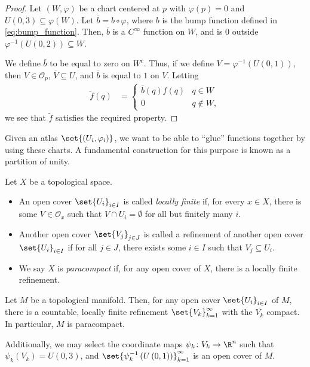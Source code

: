 \documentclass[10pt]{mypackage}
\begin{document}
\begin{proof}
  Let $\left( W,\varphi \right)$ be a chart centered at $p$ with $\varphi(p) = 0$ and $U\left( 0,3 \right)\subseteq \varphi(W)$. Let $ \overline{b} = b\circ\varphi $, where $b$ is the bump function defined in \eqref{eq:bump_function}. Then, $ \overline{b} $ is a $C^{\infty}$ function on $W$, and is $0$ outside $ \varphi^{-1}\left( U\left( 0,2 \right) \right) \subseteq W $.\newline

  We define $ \overline{b} $ to be equal to zero on $W^{c}$. Thus, if we define $V = \varphi^{-1}\left( U\left( 0,1 \right) \right)$, then $V\in \mathcal{O}_p$, $ \overline{V}\subseteq U $, and $ \overline{b} $ is equal to $1$ on $V$. Letting
  \begin{align*}
    \widetilde{f}(q) &= \begin{cases}
      \overline{b}(q) f(q) & q\in W\\
      0 & q\notin W,
    \end{cases}
  \end{align*}
  we see that $ \widetilde{f} $ satisfies the required property.
\end{proof}
Given an atlas $\set{\left( U_i,\varphi_i \right)}$, we want to be able to ``glue'' functions together by using these charts. A fundamental construction for this purpose is known as a partition of unity.
\begin{definition}
  Let $X$ be a topological space.
  \begin{itemize}
    \item An open cover $\set{U_{i}}_{i\in I}$ is called \textit{locally finite} if, for every $x\in X$, there is some $V\in \mathcal{O}_x$ such that $V\cap U_{i} = \emptyset$ for all but finitely many $i$.
    \item Another open cover $\set{V_{j}}_{j\in J}$ is called a refinement of another open cover $\set{U_i}_{i\in I}$ if for all $j\in J$, there exists some $i\in I$ such that $V_j\subseteq U_i$.
    \item We say $X$ is \textit{paracompact} if, for any open cover of $X$, there is a locally finite refinement.
  \end{itemize}
\end{definition}
\begin{proposition}
  Let $M$ be a topological manifold. Then, for any open cover $\set{U_{i}}_{i\in I}$ of $M$, there is a countable, locally finite refinement $\set{V_k}_{k=1}^{\infty}$ with the $ \overline{V_k} $ compact. In particular, $M$ is paracompact.\newline

  Additionally, we may select the coordinate maps $\psi_k\colon V_k\rightarrow \R^{n}$ such that $\psi_k\left( V_k \right) = U\left( 0,3 \right)$, and $\set{\psi_k^{-1}\left( U\left( 0,1 \right) \right)}_{k=1}^{\infty}$ is an open cover of $M$.
\end{proposition}
\end{document}
